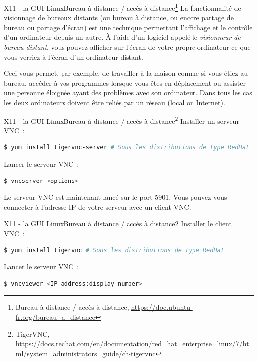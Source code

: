 \documentclass{beamer}
\begin{document}
    \begin{frame}{X11 - la GUI Linux}{Bureau à distance / accès à distance\footnote{Bureau à distance / accès à distance, \url{https://doc.ubuntu-fr.org/bureau_a_distance}}}
        La fonctionnalité de visionnage de bureaux distants (ou bureau à distance, ou encore partage de bureau ou partage d'écran) est une technique permettant l'affichage et le contrôle d'un ordinateur depuis un autre.
        À l'aide d'un logiciel appelé le \textit{visionneur de bureau distant}, vous pouvez afficher sur l'écran de votre propre ordinateur ce que vous verriez à l'écran d'un ordinateur distant.

        Ceci vous permet, par exemple, de travailler à la maison comme si vous étiez au bureau, accéder à vos programmes lorsque vous êtes en déplacement ou assister une personne éloignée ayant des problèmes avec son ordinateur.
        Dans tous les cas les deux ordinateurs doivent être reliés par un réseau (local ou Internet).
    \end{frame}


    \begin{frame}[fragile]{X11 - la GUI Linux}{Bureau à distance / accès à distance\footnote{\label{redhat-vnc}TigerVNC, \url{https://docs.redhat.com/en/documentation/red_hat_enterprise_linux/7/html/system_administrators_guide/ch-tigervnc}}}
        Installer un serveur VNC~:
        \begin{lstlisting}[language=bash]
$ yum install tigervnc-server # Sous les distributions de type RedHat
        \end{lstlisting}
        Lancer le serveur VNC~:
        \begin{lstlisting}[language=bash]
$ vncserver <options>
        \end{lstlisting}
        \begin{dangercolorbox}
            Le serveur VNC est maintenant lancé sur le port 5901.
            Vous pouvez vous connecter à l'adresse IP de votre serveur avec un client VNC.
        \end{dangercolorbox}
    \end{frame}

    \begin{frame}[fragile]{X11 - la GUI Linux}{Bureau à distance / accès à distance\cref{redhat-vnc}}
        Installer le client VNC~:
        \begin{lstlisting}[language=bash]
$ yum install tigervnc # Sous les distributions de type RedHat
        \end{lstlisting}
        Lancer le serveur VNC~:
        \begin{lstlisting}[language=bash]
$ vncviewer <IP address:display number>
        \end{lstlisting}
    \end{frame}
\end{document}
